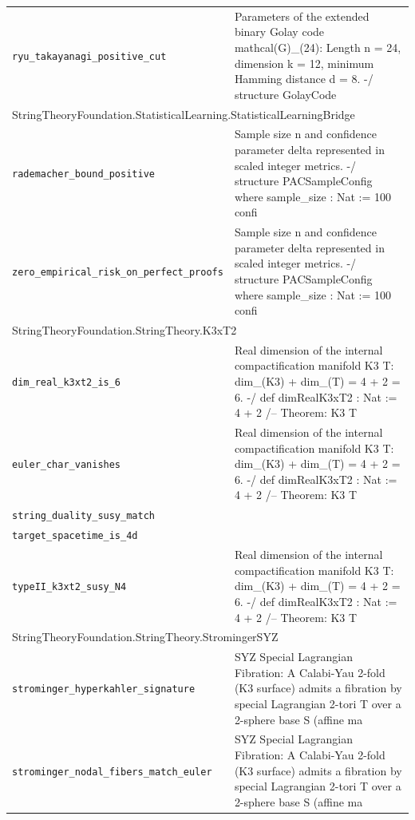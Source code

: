 \begin{longtable}{p{}p{}}
\quad\texttt{\footnotesize ryu\_takayanagi\_positive\_cut} & {\footnotesize Parameters of the extended binary Golay code  mathcal(G)\_(24): Length n = 24, dimension k = 12, minimum Hamming distance d = 8. -/ structure GolayCode} \\
\multicolumn{2}{l}{\textsf{\small StringTheoryFoundation.StatisticalLearning.StatisticalLearningBridge}} \\
\quad\texttt{\footnotesize rademacher\_bound\_positive} & {\footnotesize Sample size n and confidence parameter  delta represented in scaled integer metrics. -/ structure PACSampleConfig where sample\_size : Nat := 100 confi} \\
\quad\texttt{\footnotesize zero\_empirical\_risk\_on\_perfect\_proofs} & {\footnotesize Sample size n and confidence parameter  delta represented in scaled integer metrics. -/ structure PACSampleConfig where sample\_size : Nat := 100 confi} \\
\multicolumn{2}{l}{\textsf{\small StringTheoryFoundation.StringTheory.K3xT2}} \\
\quad\texttt{\footnotesize dim\_real\_k3xt2\_is\_6} & {\footnotesize Real dimension of the internal compactification manifold K3  T: dim\_(K3) + dim\_(T) = 4 + 2 = 6. -/ def dimRealK3xT2 : Nat := 4 + 2 /-- Theorem: K3  T } \\
\quad\texttt{\footnotesize euler\_char\_vanishes} & {\footnotesize Real dimension of the internal compactification manifold K3  T: dim\_(K3) + dim\_(T) = 4 + 2 = 6. -/ def dimRealK3xT2 : Nat := 4 + 2 /-- Theorem: K3  T } \\
\quad\texttt{\footnotesize string\_duality\_susy\_match} & {\footnotesize } \\
\quad\texttt{\footnotesize target\_spacetime\_is\_4d} & {\footnotesize } \\
\quad\texttt{\footnotesize typeII\_k3xt2\_susy\_N4} & {\footnotesize Real dimension of the internal compactification manifold K3  T: dim\_(K3) + dim\_(T) = 4 + 2 = 6. -/ def dimRealK3xT2 : Nat := 4 + 2 /-- Theorem: K3  T } \\
\multicolumn{2}{l}{\textsf{\small StringTheoryFoundation.StringTheory.StromingerSYZ}} \\
\quad\texttt{\footnotesize strominger\_hyperkahler\_signature} & {\footnotesize SYZ Special Lagrangian Fibration: A Calabi-Yau 2-fold (K3 surface) admits a fibration by special Lagrangian 2-tori T over a 2-sphere base S (affine ma} \\
\quad\texttt{\footnotesize strominger\_nodal\_fibers\_match\_euler} & {\footnotesize SYZ Special Lagrangian Fibration: A Calabi-Yau 2-fold (K3 surface) admits a fibration by special Lagrangian 2-tori T over a 2-sphere base S (affine ma} \\

\end{longtable}
